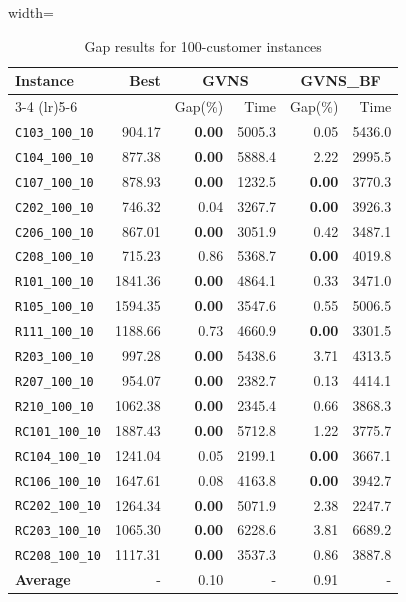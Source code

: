 \begin{table}[ht]
\centering
\small
\setlength{\tabcolsep}{5pt}
\caption{Gap results for 100-customer instances}
\vspace{4mm}
\begin{adjustbox}{width=\textwidth}
\begin{tabular}{l r r r @{\hspace{8pt}} r r @{\hspace{8pt}}}
\toprule
\multirow{2}{*}{Instance} & \multirow{2}{*}{Best} & \multicolumn{2}{c}{GVNS} & \multicolumn{2}{c}{GVNS\_BF} \\
\cmidrule(lr){3-4} \cmidrule(lr){5-6}
 &  & Gap(\%) & Time & Gap(\%) & Time \\
\midrule
\texttt{C103\_100\_10} & 904.17 & \textbf{0.00} & 5005.3 & 0.05 & 5436.0 \\
\texttt{C104\_100\_10} & 877.38 & \textbf{0.00} & 5888.4 & 2.22 & 2995.5 \\
\texttt{C107\_100\_10} & 878.93 & \textbf{0.00} & 1232.5 & \textbf{0.00} & 3770.3 \\
\texttt{C202\_100\_10} & 746.32 & 0.04 & 3267.7 & \textbf{0.00} & 3926.3 \\
\texttt{C206\_100\_10} & 867.01 & \textbf{0.00} & 3051.9 & 0.42 & 3487.1 \\
\texttt{C208\_100\_10} & 715.23 & 0.86 & 5368.7 & \textbf{0.00} & 4019.8 \\
\texttt{R101\_100\_10} & 1841.36 & \textbf{0.00} & 4864.1 & 0.33 & 3471.0 \\
\texttt{R105\_100\_10} & 1594.35 & \textbf{0.00} & 3547.6 & 0.55 & 5006.5 \\
\texttt{R111\_100\_10} & 1188.66 & 0.73 & 4660.9 & \textbf{0.00} & 3301.5 \\
\texttt{R203\_100\_10} & 997.28 & \textbf{0.00} & 5438.6 & 3.71 & 4313.5 \\
\texttt{R207\_100\_10} & 954.07 & \textbf{0.00} & 2382.7 & 0.13 & 4414.1 \\
\texttt{R210\_100\_10} & 1062.38 & \textbf{0.00} & 2345.4 & 0.66 & 3868.3 \\
\texttt{RC101\_100\_10} & 1887.43 & \textbf{0.00} & 5712.8 & 1.22 & 3775.7 \\
\texttt{RC104\_100\_10} & 1241.04 & 0.05 & 2199.1 & \textbf{0.00} & 3667.1 \\
\texttt{RC106\_100\_10} & 1647.61 & 0.08 & 4163.8 & \textbf{0.00} & 3942.7 \\
\texttt{RC202\_100\_10} & 1264.34 & \textbf{0.00} & 5071.9 & 2.38 & 2247.7 \\
\texttt{RC203\_100\_10} & 1065.30 & \textbf{0.00} & 6228.6 & 3.81 & 6689.2 \\
\texttt{RC208\_100\_10} & 1117.31 & \textbf{0.00} & 3537.3 & 0.86 & 3887.8 \\
\midrule
\textbf{Average} & - & 0.10 & - & 0.91 & - \\
\bottomrule
\end{tabular}
\end{adjustbox}
\end{table}
